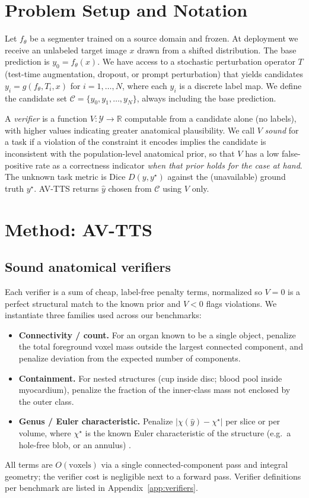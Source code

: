 \documentclass[10pt]{article}
\begin{document}
\section{Problem Setup and Notation}
Let $f_\theta$ be a segmenter trained on a source domain and frozen. At deployment we receive an unlabeled target image $x$ drawn from a shifted distribution. The base prediction is $y_0=f_\theta(x)$. We have access to a stochastic perturbation operator $T$ (test-time augmentation, dropout, or prompt perturbation) that yields candidates $y_i = g(f_\theta, T_i, x)$ for $i=1,\dots,N$, where each $y_i$ is a discrete label map. We define the candidate set $\mathcal{C}=\{y_0,y_1,\dots,y_N\}$, always including the base prediction.

A \emph{verifier} is a function $V:\mathcal{Y}\to\mathbb{R}$ computable from a candidate alone (no labels), with higher values indicating greater anatomical plausibility. We call $V$ \emph{sound} for a task if a violation of the constraint it encodes implies the candidate is inconsistent with the population-level anatomical prior, so that $V$ has a low false-positive rate as a correctness indicator \emph{when that prior holds for the case at hand}. The unknown task metric is Dice $D(y,y^\star)$ against the (unavailable) ground truth $y^\star$. AV-TTS returns $\hat y$ chosen from $\mathcal{C}$ using $V$ only.

\section{Method: AV-TTS}
\subsection{Sound anatomical verifiers}
Each verifier is a sum of cheap, label-free penalty terms, normalized so $V=0$ is a perfect structural match to the known prior and $V<0$ flags violations. We instantiate three families used across our benchmarks:
\begin{itemize}\setlength\itemsep{0.15em}
\item \textbf{Connectivity / count.} For an organ known to be a single object, penalize the total foreground voxel mass outside the largest connected component, and penalize deviation from the expected number of components.
\item \textbf{Containment.} For nested structures (cup inside disc; blood pool inside myocardium), penalize the fraction of the inner-class mass not enclosed by the outer class.
\item \textbf{Genus / Euler characteristic.} Penalize $|\chi(\hat y)-\chi^\star|$ per slice or per volume, where $\chi^\star$ is the known Euler characteristic of the structure (e.g.\ a hole-free blob, or an annulus) \citep{eulerchar2025}.
\end{itemize}
All terms are $O(\text{voxels})$ via a single connected-component pass and integral geometry; the verifier cost is negligible next to a forward pass. Verifier definitions per benchmark are listed in Appendix~\ref{app:verifiers}.
\end{document}
